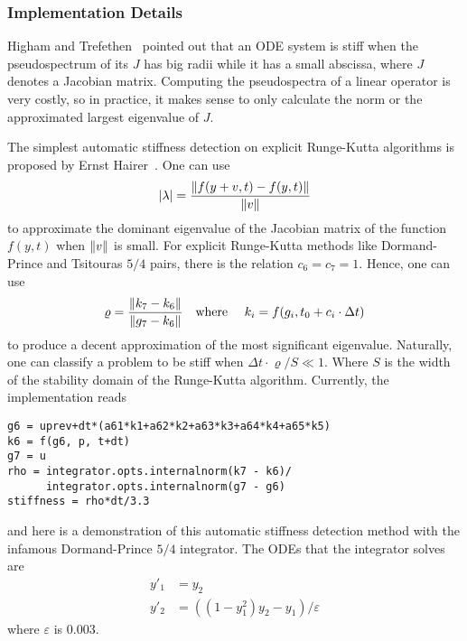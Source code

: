 \documentclass[12pt]{article}
\begin{document}
\subsubsection{Implementation Details}
Higham and Trefethen~\cite{stiffode} pointed out that an ODE system is stiff
when the pseudospectrum of its $J$ has big radii while it has a small abscissa,
where $J$ denotes a Jacobian matrix. Computing the pseudospectra of a linear
operator is very costly, so in practice, it makes sense to only calculate the norm
or the approximated largest eigenvalue of $J$.

The simplest automatic stiffness detection on explicit Runge-Kutta algorithms
is proposed by Ernst Hairer~\cite{hairer2}. One can use
\begin{equation}
  \abs{\lambda} = \frac{\norm{f(y+v, t)-f(y, t)}}{\norm{v}}
\end{equation}
to approximate the dominant eigenvalue of the Jacobian matrix of the function
$f(y, t)$ when $\norm{v}$ is small. For explicit Runge-Kutta methods like
Dormand-Prince and Tsitouras $5/4$ pairs, there is the relation $c_6 = c_7 =
1$. Hence, one can use
\begin{equation}
  \varrho = \frac{\norm{k_7-k_6}}{\norm{g_7-k_6}}\qqtext{where } k_i = f(g_i,
  t_0 + c_i\cdot \Delta t)
\end{equation}
to produce a decent approximation of the most significant eigenvalue.
Naturally, one can classify a problem to be stiff when $\Delta
t\cdot\varrho/S \ll 1$. Where $S$ is the width of the stability domain of the
Runge-Kutta algorithm. Currently, the implementation reads

\begin{lstlisting}
g6 = uprev+dt*(a61*k1+a62*k2+a63*k3+a64*k4+a65*k5)
k6 = f(g6, p, t+dt)
g7 = u
rho = integrator.opts.internalnorm(k7 - k6)/
      integrator.opts.internalnorm(g7 - g6)
stiffness = rho*dt/3.3
\end{lstlisting}

and here is a demonstration of this automatic stiffness detection method with
the infamous Dormand-Prince $5/4$ integrator. The ODEs that the integrator
solves are
\begin{align}
  y'_1 &= y_2\\
  y'_2 &= ((1-y_1^2)y_2-y_1) / \varepsilon
\end{align}
where $\varepsilon$ is $0.003$.


\end{document}
